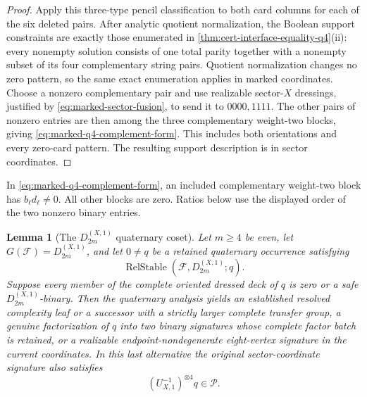 \documentclass[11pt,letterpaper,onecolumn]{article}
\theoremstyle{plain}
\newtheorem{lemma}[lemma]{Lemma}
\theoremstyle{definition}
\theoremstyle{remark}
\newcommand{\cF}{\mathcal F}
\newcommand{\cP}{\mathscr P}
\newcommand{\DihXone}[1]{{D_{#1}^{(X,1)}}}
\begin{document}
\begin{proof}
Apply this three-type pencil classification to both card columns for
each of the six deleted pairs.  After analytic quotient normalization, the
Boolean support constraints are exactly those enumerated in
\cref{thm:cert-interface-equality-q4}\textnormal{(ii)}: every nonempty solution consists of
one total parity together with a nonempty subset of its four complementary
string pairs.  Quotient normalization changes no zero pattern, so the same
exact enumeration applies in marked coordinates.  Choose a nonzero
complementary pair and use realizable sector-\(X\) dressings, justified by
\cref{eq:marked-sector-fusion}, to send it to \(0000,1111\).  The other
pairs of nonzero entries are then among the three complementary weight-two blocks, giving
\cref{eq:marked-q4-complement-form}.  This includes both orientations and
every zero-card pattern. The resulting support description is in sector coordinates.
\end{proof}

In \cref{eq:marked-q4-complement-form}, an included complementary
weight-two block has \(b_\ell d_\ell\ne0\). All other blocks are zero.  Ratios below use the
displayed order of the two nonzero binary entries.

\begin{lemma}[The \(\DihXone{2m}\) quaternary coset]
\label{lem:marked-A-q4}
Let \(m\ge4\) be even, let \(G(\cF)=\DihXone{2m}\), and let
\(0\ne q\) be a retained quaternary occurrence satisfying
\[
 \operatorname{RelStable}(\cF,\DihXone{2m};q).
\]
Suppose every member of the complete oriented dressed deck of \(q\) is
zero or a safe \(\DihXone{2m}\)-binary.  Then the quaternary analysis yields an established
resolved complexity leaf or a successor with a strictly larger complete transfer group, a genuine factorization of
\(q\) into two binary signatures whose complete factor batch is retained,
or a realizable endpoint-nondegenerate eight-vertex signature in the current coordinates. In this last alternative the original
sector-coordinate signature also satisfies
\[
 (U_{X,1}^{-1})^{\otimes4}q\in\cP.
\]
\end{lemma}
\end{document}
